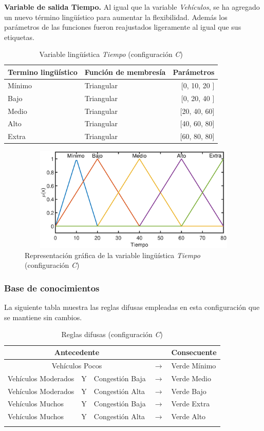 \pagebreak
\textbf{Variable de salida Tiempo.} Al igual que la variable \textit{Vehículos}, se ha agregado un nuevo término lingüístico para aumentar la flexibilidad. Además los parámetros de las funciones fueron reajustados ligeramente al igual que sus etiquetas.

\begin{table}[!h]
	\centering
	\begin{tabular}{llr} \toprule
		Termino lingüístico & Función de membresía & Parámetros \\ \midrule
		Mínimo & Triangular & [0, 10, 20 ] \\
		Bajo & Triangular & [0, 20, 40 ] \\
		Medio & Triangular & [20, 40, 60] \\
		Alto & Triangular & [40, 60, 80] \\
		Extra & Triangular & [60, 80, 80] \\ \bottomrule
	\end{tabular}
	\caption{Variable lingüística \textit{Tiempo} (configuración \textit{C})}
\end{table}

\begin{figure}[H]
	\centering
	\includegraphics[height=5cm, width=12cm]{Variables/ConfigC_output1.eps}
	\caption{Representación gráfica de la variable lingüística \textit{Tiempo} (configuración \textit{C})}
\end{figure}

\subsubsection{Base de conocimientos}
La siguiente tabla muestra las reglas difusas empleadas en esta configuración que se mantiene sin cambios.
\begin{longtable}[c]{lclcl} \toprule
	\multicolumn{3}{c}{Antecedente} & & Consecuente \\ \midrule
	\multicolumn{3}{c}{Vehículos Pocos} & $\rightarrow$ & Verde Mínimo \\
	Vehículos Moderados & Y & Congestión Baja& $\rightarrow$ & Verde Medio \\
	Vehículos Moderados & Y & Congestión Alta& $\rightarrow$ & Verde Bajo \\
	Vehículos Muchos &Y& Congestión Baja& $\rightarrow$ & Verde Extra \\
	Vehículos Muchos &Y& Congestión Alta& $\rightarrow$ & Verde Alto \\ \hline
	\caption{Reglas difusas (configuración \textit{C})}
\end{longtable}

